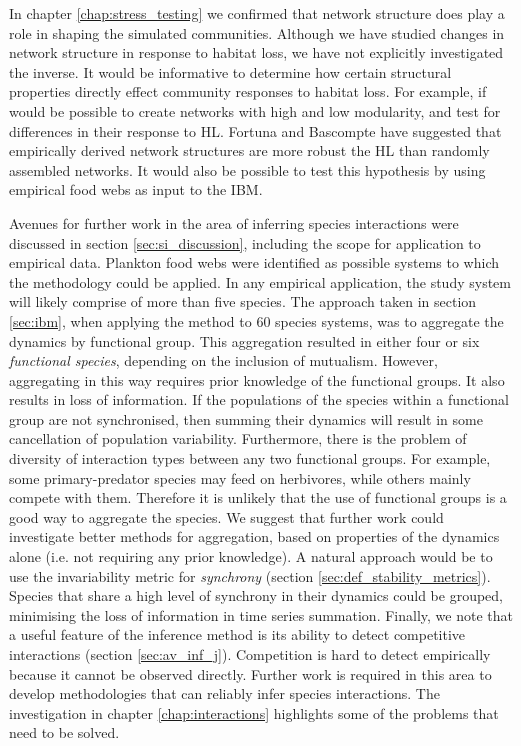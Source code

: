 In chapter \ref{chap:stress_testing} we confirmed that network structure does play a role in shaping the simulated communities. Although we have studied changes in network structure in response to habitat loss, we have not explicitly investigated the inverse. It would be informative to determine how certain structural properties directly effect community responses to habitat loss. For example, if would be possible to create networks with high and low modularity, and test for differences in their response to HL. Fortuna and Bascompte \cite{fortuna2006habitat} have suggested that empirically derived network structures are more robust the HL than randomly assembled networks. It would also be possible to test this hypothesis by using empirical food webs as input to the IBM. 

Avenues for further work in the area of inferring species interactions were discussed in section \ref{sec:si_discussion}, including the scope for application to empirical data. Plankton food webs were identified as possible systems to which the methodology could be applied. In any empirical application, the study system will likely comprise of more than five species. The approach taken in section \ref{sec:ibm}, when applying the method to 60 species systems, was to aggregate the dynamics by functional group. This aggregation resulted in either four or six \emph{functional species}, depending on the inclusion of mutualism. However, aggregating in this way requires prior knowledge of the functional groups. It also results in loss of information. If the populations of the species within a functional group are not synchronised, then summing their dynamics will result in some cancellation of population variability. Furthermore, there is the problem of diversity of interaction types between any two functional groups. For example, some primary-predator species may feed on herbivores, while others mainly compete with them. Therefore it is unlikely that the use of functional groups is a good way to aggregate the species. We suggest that further work could investigate better methods for aggregation, based on properties of the dynamics alone (i.e. not requiring any prior knowledge). A natural approach would be to use the invariability metric for \emph{synchrony} (section \ref{sec:def_stability_metrics}). Species that share a high level of synchrony in their dynamics could be grouped, minimising the loss of information in time series summation. Finally, we note that a useful feature of the inference method is its ability to detect competitive interactions (section \ref{sec:av_inf_j}). Competition is hard to detect empirically because it cannot be observed directly. Further work is required in this area to develop methodologies that can reliably infer species interactions. The investigation in chapter \ref{chap:interactions} highlights some of the problems that need to be solved. 

